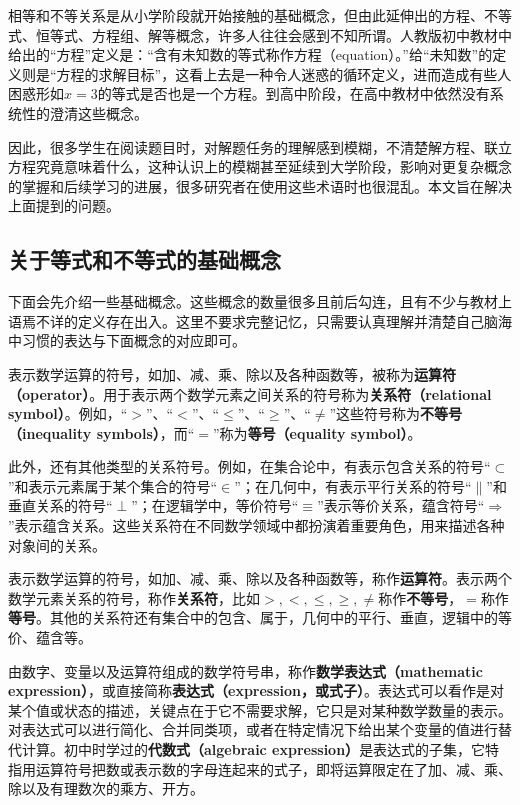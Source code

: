 
\begin{issues}
\issueDraft
\end{issues}


相等和不等关系是从小学阶段就开始接触的基础概念，但由此延伸出的方程、不等式、恒等式、方程组、解等概念，许多人往往会感到不知所谓。人教版初中教材中给出的“方程”定义是：“含有未知数的等式称作方程（equation）。”给“未知数”的定义则是“方程的求解目标”，这看上去是一种令人迷惑的循环定义，进而造成有些人困惑形如$x=3$的等式是否也是一个方程。到高中阶段，在高中教材中依然没有系统性的澄清这些概念。

因此，很多学生在阅读题目时，对解题任务的理解感到模糊，不清楚解方程、联立方程究竟意味着什么，这种认识上的模糊甚至延续到大学阶段，影响对更复杂概念的掌握和后续学习的进展，很多研究者在使用这些术语时也很混乱。本文旨在解决上面提到的问题。

\subsection{关于等式和不等式的基础概念}

下面会先介绍一些基础概念。这些概念的数量很多且前后勾连，且有不少与教材上语焉不详的定义存在出入。这里不要求完整记忆，只需要认真理解并清楚自己脑海中习惯的表达与下面概念的对应即可。

表示数学运算的符号，如加、减、乘、除以及各种函数等，被称为\textbf{运算符（operator）}。用于表示两个数学元素之间关系的符号称为\textbf{关系符（relational symbol）}。例如，“$>$”、“$<$”、“$\leq$”、“$\geq$”、“$\neq$”这些符号称为\textbf{不等号（inequality symbols）}，而“$=$”称为\textbf{等号（equality symbol）}。

此外，还有其他类型的关系符号。例如，在集合论中，有表示包含关系的符号“$\subset$”和表示元素属于某个集合的符号“$\in$”；在几何中，有表示平行关系的符号“$\parallel$”和垂直关系的符号“$\perp$”；在逻辑学中，等价符号“$\equiv$”表示等价关系，蕴含符号“$\Rightarrow$”表示蕴含关系。这些关系符在不同数学领域中都扮演着重要角色，用来描述各种对象间的关系。

表示数学运算的符号，如加、减、乘、除以及各种函数等，称作\textbf{运算符}。表示两个数学元素关系的符号，称作\textbf{关系符}，比如$>,<,\leq,\geq,\neq$称作\textbf{不等号}，$=$称作\textbf{等号}。其他的关系符还有集合中的包含、属于，几何中的平行、垂直，逻辑中的等价、蕴含等。

由数字、变量以及运算符组成的数学符号串，称作\textbf{数学表达式（mathematic expression）}，或直接简称\textbf{表达式（expression，或式子）}。表达式可以看作是对某个值或状态的描述，关键点在于它不需要求解，它只是对某种数学数量的表示。对表达式可以进行简化、合并同类项，或者在特定情况下给出某个变量的值进行替代计算。初中时学过的\textbf{代数式（algebraic expression）}是表达式的子集，它特指用运算符号把数或表示数的字母连起来的式子，即将运算限定在了加、减、乘、除以及有理数次的乘方、开方。


